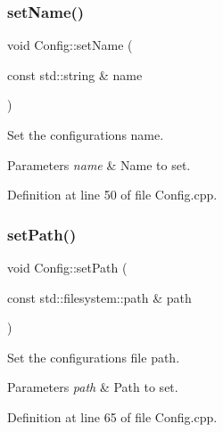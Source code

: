 \mbox{\label{classcfg_1_1_config_a04f2e4ad0070a73728c4bce7b7dd0c29}} 
\subsubsection{\texorpdfstring{set\+Name()}{setName()}}
{\footnotesize\ttfamily void Config\+::set\+Name (\begin{DoxyParamCaption}\item[{const std\+::string \&}]{name }\end{DoxyParamCaption})}



Set the configuration\textquotesingle{}s name. 


\begin{DoxyParams}{Parameters}
{\em name} & Name to set. \\
\hline
\end{DoxyParams}


Definition at line 50 of file Config.\+cpp.

\mbox{\label{classcfg_1_1_config_a4c237371c0ad09ff75d1db7d31a1f362}} 
\subsubsection{\texorpdfstring{set\+Path()}{setPath()}}
{\footnotesize\ttfamily void Config\+::set\+Path (\begin{DoxyParamCaption}\item[{const std\+::filesystem\+::path \&}]{path }\end{DoxyParamCaption})}



Set the configuration\textquotesingle{}s file path. 


\begin{DoxyParams}{Parameters}
{\em path} & Path to set. \\
\hline
\end{DoxyParams}


Definition at line 65 of file Config.\+cpp.

\mbox{\label{classcfg_1_1_config_aae2d7dbb7d3d329f1afffef4b95de204}} 
